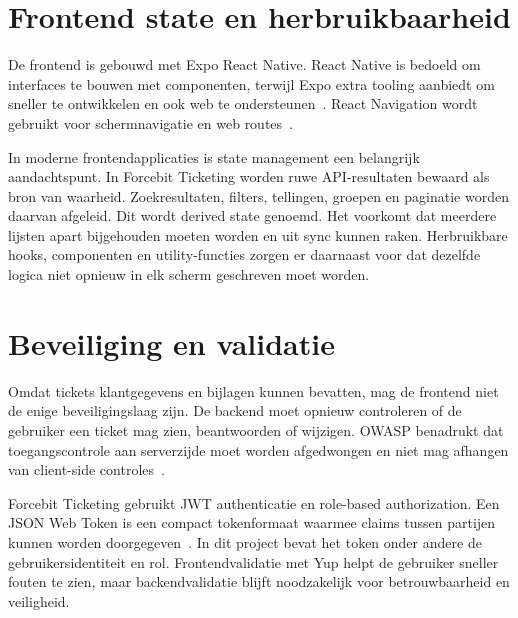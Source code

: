 \section{Frontend state en herbruikbaarheid}

De frontend is gebouwd met Expo React Native. React Native is bedoeld om interfaces te bouwen met componenten, terwijl Expo extra tooling aanbiedt om sneller te ontwikkelen en ook web te ondersteunen~\autocite{ReactNative2026,ExpoDocs2026}. React Navigation wordt gebruikt voor schermnavigatie en web routes~\autocite{ReactNavigation2026}.

In moderne frontendapplicaties is state management een belangrijk aandachtspunt. In Forcebit Ticketing worden ruwe API-resultaten bewaard als bron van waarheid. Zoekresultaten, filters, tellingen, groepen en paginatie worden daarvan afgeleid. Dit wordt derived state genoemd. Het voorkomt dat meerdere lijsten apart bijgehouden moeten worden en uit sync kunnen raken. Herbruikbare hooks, componenten en utility-functies zorgen er daarnaast voor dat dezelfde logica niet opnieuw in elk scherm geschreven moet worden.

\section{Beveiliging en validatie}

Omdat tickets klantgegevens en bijlagen kunnen bevatten, mag de frontend niet de enige beveiligingslaag zijn. De backend moet opnieuw controleren of de gebruiker een ticket mag zien, beantwoorden of wijzigen. OWASP benadrukt dat toegangscontrole aan serverzijde moet worden afgedwongen en niet mag afhangen van client-side controles~\autocite{OWASPAccessControl2026}.

Forcebit Ticketing gebruikt JWT authenticatie en role-based authorization. Een JSON Web Token is een compact tokenformaat waarmee claims tussen partijen kunnen worden doorgegeven~\autocite{JwtRFC7519}. In dit project bevat het token onder andere de gebruikersidentiteit en rol. Frontendvalidatie met Yup helpt de gebruiker sneller fouten te zien, maar backendvalidatie blijft noodzakelijk voor betrouwbaarheid en veiligheid.

\vspace*{\fill}

